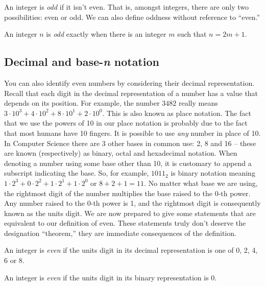 An integer is {\em odd} if it isn't even.  That is, amongst integers,
there are only two possibilities: even or odd.  We can also define
oddness without reference to ``even.''

\begin{defi}
An integer $n$ is {\em odd} exactly when there is an integer $m$
such that $n = 2m + 1$.
\end{defi}


\subsection{Decimal and base-\emph{n} notation}\label{base-n}

You can also identify even numbers by considering their
decimal representation.  Recall that each digit in the 
decimal representation of a number has a value that depends
on its position.  For example, the number $3482$ really means
$3\cdot10^3 + 4\cdot10^2 + 8\cdot10^1 + 2\cdot10^0$.  This 
is also known as place notation.  
The fact that we use the 
powers of 10 in our place notation is probably due to the
fact that most humans have 10 fingers.  It is possible to
use {\em any} number in place of 10.  In Computer Science there
are 3 other bases in common use: 2, 8 and 16 -- these are
known (respectively) as binary, octal and hexadecimal notation.
When denoting a number using some base other than 10, it is
customary to append a subscript indicating the base.
So, for example, $1011_2$ is binary notation meaning
$1\cdot2^3 + 0\cdot2^2 + 1\cdot2^1 + 1\cdot2^0$ or $8+2+1 = 11$.
No matter what base we are using, the rightmost digit of
the number multiplies the base raised to the $0$-th power.
Any number raised to the $0$-th power is 1, and the rightmost
digit is consequently known as the units digit.  We are now
prepared to give some statements that are equivalent to our
definition of even.  These statements truly don't deserve the
designation ``theorem,'' they are immediate consequences of the
definition.

\begin{thm}
An integer is {\em even} if the units digit in its decimal
representation is one of 0, 2, 4, 6 or 8.
\end{thm}

\begin{thm}
An integer is {\em even} if the units digit in its binary
representation is 0.
\end{thm}

\vspace{.5 in}

